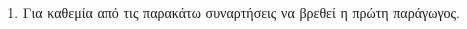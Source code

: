 \begin{enumerate}
\item 
Για καθεμία από τις παρακάτω συναρτήσεις να βρεθεί η πρώτη παράγωγος.
\begin{multicols}{2}
\end{multicols}


\end{enumerate}
